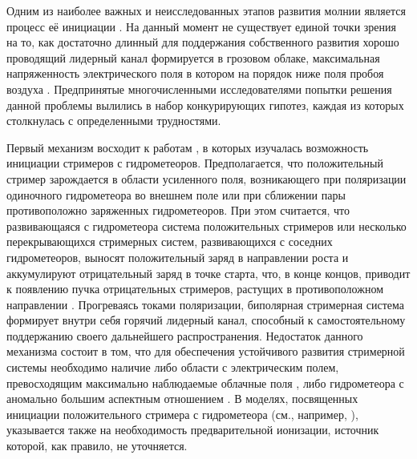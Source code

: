Одним из наиболее важных и неисследованных этапов развития молнии является процесс её инициации \cite{Dwyer2014}. На данный момент не существует единой точки зрения на то, как достаточно длинный для поддержания собственного развития хорошо проводящий лидерный канал формируется в грозовом облаке, максимальная напряженность электрического поля в котором на порядок ниже поля пробоя воздуха \cite{Marshall1995}. Предпринятые многочисленными исследователями попытки решения данной проблемы вылились в набор конкурирующих гипотез, каждая из которых столкнулась с определенными трудностями.

Первый механизм восходит к работам \cite{Loeb1966, Phelps1974, Griffiths1976}, в которых изучалась возможность инициации стримеров с гидрометеоров. Предполагается, что положительный стример зарождается в области усиленного поля, возникающего при поляризации одиночного гидрометеора во внешнем поле или при сближении пары противоположно заряженных гидрометеоров. При этом считается, что развивающаяся с гидрометеора система положительных стримеров или несколько перекрывающихся стримерных систем, развивающихся с соседних гидрометеоров, выносят положительный заряд в направлении роста и аккумулируют отрицательный заряд в точке старта, что, в конце концов, приводит к появлению пучка отрицательных стримеров, растущих в противоположном направлении \cite{Griffiths1976}. Прогреваясь токами поляризации, биполярная стримерная система формирует внутри себя горячий лидерный канал, способный к самостоятельному поддержанию своего дальнейшего распространения. Недостаток данного механизма состоит в том, что для обеспечения устойчивого развития стримерной системы необходимо наличие либо области с электрическим полем, превосходящим максимально наблюдаемые облачные поля \cite{Griffiths1976}, либо гидрометеора с аномально большим аспектным отношением \cite{Dubinova2015}. В моделях, посвященных инициации положительного стримера с гидрометеора (см., например, \cite{Sadighi2015, Cai2017}), указывается также на необходимость предварительной ионизации, источник которой, как правило, не уточняется.


